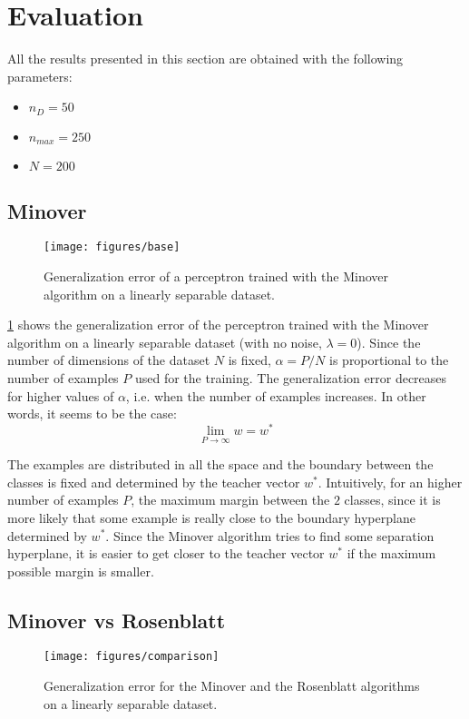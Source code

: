 \section{Evaluation}
\label{sec:evaluation}

All the results presented in this section are obtained with the following parameters:
\begin{itemize}
    \item $n_D = 50$
    \item $n_{max} = 250$
    \item $N = 200$
\end{itemize}

\subsection{Minover}
\begin{figure}[t]
	\centering
	\texttt{[image: figures/base]}
    \caption{Generalization error of a perceptron trained with the Minover algorithm on a linearly separable dataset.}
	\label{fig:base}
\end{figure}

\cref{fig:base} shows the generalization error of the perceptron trained with the Minover algorithm on a linearly separable dataset (with no noise, $\lambda = 0$).
Since the number of dimensions of the dataset $N$ is fixed, $\alpha = P / N$ is proportional to the number of examples $P$ used for the training.
The generalization error decreases for higher values of $\alpha$, i.e. when the number of examples increases.
In other words, it seems to be the case:
$$\lim_{P \to \infty} w = w^{*}$$

The examples are distributed in all the space and the boundary between the classes is fixed and determined by the teacher vector $w^{*}$.
Intuitively, for an higher number of examples $P$, the maximum margin between the $2$ classes, since it is more likely that some example is really close to the boundary hyperplane determined by $w^{*}$.
Since the Minover algorithm tries to find some separation hyperplane, it is easier to get closer to the teacher vector $w^{*}$ if the maximum possible margin is smaller.


\subsection{Minover vs Rosenblatt}
\begin{figure}[t]
	\centering
	\texttt{[image: figures/comparison]}
    \caption{Generalization error for the Minover and the Rosenblatt algorithms on a linearly separable dataset.}
	\label{fig:comparison}
\end{figure}

